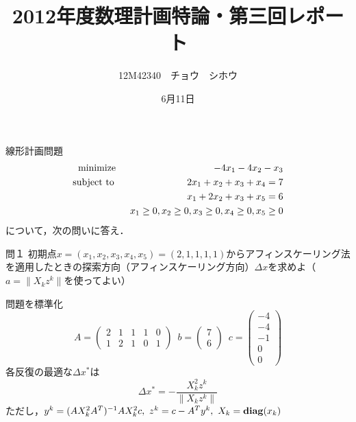 \documentclass[a4paper,11pt]{jsarticle}
\title{2012年度数理計画特論・第三回レポート}
\author{12M42340　チョウ　シホウ}
\date{6月11日}
\numberwithin{theorem}{section}  %
\numberwithin{equation}{section} %
\newcommand{\st}{\mathop{\rm subject~to\,}\limits}
\newcommand{\diag}{\mathop{\mathrm{\bf diag}}\nolimits}
\newcommand{\minimize}{\mathop{\mathrm{\rm minimize}}\limits}
\begin{document}
{}
\renewcommand{\thepart}{\arabic{part}}

線形計画問題
\begin{eqnarray*}
\minimize \,\,\,&& -4x_1 -4x_2 -x_3\\
\st \,\,\,&& 2x_1 + x_2 + x_3 +x_4 =7\\
&& x_1 +2x_2 +x_3 +x_5 = 6\\
&&x_1 \ge 0, x_2 \ge 0, x_3 \ge 0, x_4 \ge 0, x_5 \ge 0
\end{eqnarray*}
について，次の問いに答え．
\begin{itembox}[l]{問１}
初期点$x=(x_1,x_2,x_3,x_4,x_5)=(2,1,1,1,1)$からアフィンスケーリング法を適用したときの探索方向（アフィンスケーリング方向）$\Delta x$を求めよ（$a=\|X_kz^k\|$を使ってよい）
\end{itembox}
問題を標準化
\[
A=\begin{pmatrix}
2 &1 &1 &1 &0 \\
1 &2 &1 &0 &1
\end{pmatrix}
\,\,\,
b = \begin{pmatrix}
7\\6
\end{pmatrix}
\,\,\,
c = \begin{pmatrix}
-4 \\ -4 \\ -1 \\ 0 \\ 0
\end{pmatrix}
\]
各反復の最適な$\Delta x^*$は
\[
\Delta x^* = -\frac{ X_k^2z^k}{\| X_kz^k \|}
\]
ただし，$y^k=(AX_k^2A^T)^{-1}AX_k^2c,\,\,z^k=c-A^Ty^k,\,\,X_k=\diag(x_k)$
\end{document}
